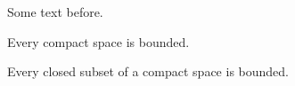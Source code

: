 \documentclass{article}
\begin{document}
Some text before.

 Every compact space is bounded.\\


Every closed subset of a compact space is bounded.
\end{document}
